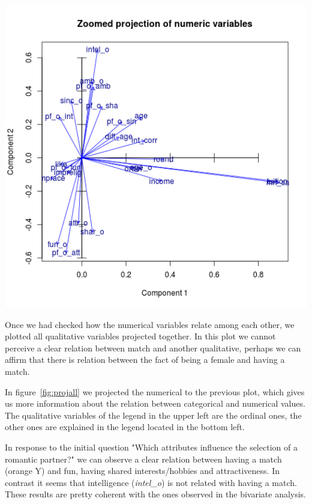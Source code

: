 \begin{center}
\includegraphics[width=5.5in]{images/ACP/projection_num_vars.png}
\label{fig:projnum}
\end{center}

Once we had checked how the numerical variables relate among each other, we plotted all qualitative variables projected together. In this plot we cannot perceive a clear relation between match and another qualitative, perhaps we can affirm that there is relation between the fact of being a female and having a match.

In figure~\ref{fig:projall} we projected the numerical to the previous plot, which gives us more information about the relation between categorical and numerical values. The qualitative variables of the legend in the upper left are the ordinal ones, the other ones are explained in the legend located in the bottom left.

In response to the initial question "Which attributes influence the selection of a romantic partner?" we can observe a clear relation between having a match (orange Y) and fun, having shared interests/hobbies and attractiveness. In contrast it seems that intelligence (\textit{intel\_o}) is not related with having a match. These results are pretty coherent with the ones observed in the bivariate analysis.

